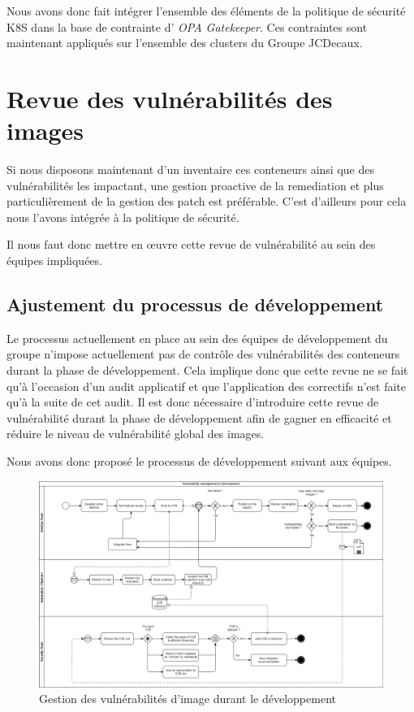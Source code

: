 Nous avons donc fait intégrer l'ensemble des éléments de la politique de sécurité \ac{K8S} dans la base de contrainte d'
\emph{OPA Gatekeeper}. Ces contraintes sont maintenant appliqués sur l'ensemble des clusters du Groupe JCDecaux.
\newpage

\section{Revue des vulnérabilités des images} \label{section:revue-vul-img}
Si nous disposons maintenant d'un inventaire ces conteneurs ainsi que des vulnérabilités les impactant, une gestion 
proactive de la remediation et plus particulièrement de la gestion des patch est préférable. C'est d'ailleurs pour cela 
nous l'avons intégrée à la politique de sécurité.

Il nous faut donc mettre en œuvre cette revue de vulnérabilité au sein des équipes impliquées.

\subsection{Ajustement du processus de développement}

Le processus  actuellement en place au sein des équipes de développement du groupe n'impose actuellement pas de contrôle
des vulnérabilités des conteneurs durant la phase de développement. Cela implique donc que cette revue ne se fait qu'à 
l'occasion d'un audit applicatif et que l'application des correctifs n'est faite qu'à la suite de cet audit. 
\newline Il est donc nécessaire d'introduire cette revue de vulnérabilité durant la phase de développement afin de gagner
en efficacité et réduire le niveau de vulnérabilité global des images.

Nous avons donc proposé le processus de développement suivant aux équipes.
\begin{figure}[h]
    \centering
    \includegraphics[width=\linewidth]{resources/img/container_image_vuln_mgnt_dev.png}
    \caption{Gestion des vulnérabilités d'image durant le développement}
\end{figure}

